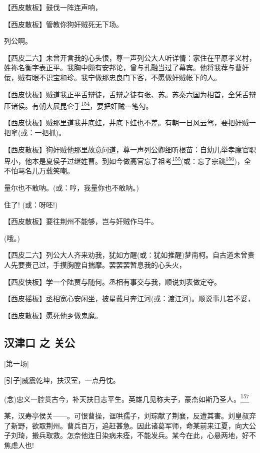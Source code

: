 【西皮散板】鼓伐一阵连声响，

【西皮散板】管教你狗奸贼死无下场。

列公啊。

【西皮二六】未曾开言我的心头恨，尊一声列公大人听详情：家住在平原孝义村，姓祢名衡字表正平。我胸中颇有安邦论，曾与孔融当过了幕宾。他将我荐与曹奸佞，贼有眼不识宝和珍。我宁做那忠良门下客，不愿做奸贼帐下的人。

【西皮快板】贼道我正平舌辩徒，舌辩之徒有张、苏。苏秦六国为相首，全凭舌辩压诸侯。有朝大展昆仑手\protect\hyperlink{fn154}{\textsuperscript{154}}，要把奸贼一笔勾。

【西皮快板】贼那里道我井底蛙，井底下蛙也不差。有朝一日风云驾，要把奸贼一把拿(或：一把抓)。

【西皮散板】狗奸贼他那里故意问道，尊一声列公卿细听根苗：自幼儿举孝廉官职卑小，他本是夏侯子过继姓曹。到如今做高官忘了祖考\protect\hyperlink{fn155}{\textsuperscript{155}}(或：忘了宗祧\protect\hyperlink{fn156}{\textsuperscript{156}})，全不怕骂名儿万载笑嘲。

量尔也不敢呐。(或：哼，我量你也不敢呐。)

住了! (或：呀呸!)

【西皮散板】要往荆州不能够，岂与奸贼作马牛。

(哦。)

【西皮二六】列公大人齐来劝我，犹如方醒(或：犹如推醒)梦南柯。自古道未曾责人先要责己过，手摸胸膛自揣摩。罢罢罢暂息我的心头火，

【西皮快板】学一个陆贾与随何。丞相有事交与我，顺说刘表做定夺。

【西皮摇板】丞相宽心安闲坐，披星戴月奔江河(或：渡江河)。顺说事儿若不妥，

【西皮散板】愿死他乡做鬼魔。

\newpage
\hypertarget{ux6c49ux6d25ux53e3-ux4e4b-ux5173ux516c}{%
\subsection{汉津口 之
关公}\label{ux6c49ux6d25ux53e3-ux4e4b-ux5173ux516c}}

{[}第一场{]}

{[}引子{]}威震乾坤，扶汉室，一点丹忱。

(念)忠义一腔贯古今，补天扶日志平生。英雄几见称夫子，豪杰如斯乃圣人。\protect\hyperlink{fn157}{\textsuperscript{157}}

某，汉寿亭侯关------。可恨曹操，诓哄孺子，刘琮献了荆襄，反遭其害。刘皇叔弃了新野，欲取荆州。曹兵百万，追赶甚急。因此诸葛军师，命某前来江夏，向大公子刘琦，搬兵取救。怎奈他连日染病未痊，不能发兵。某今在此，心悬两地，好不焦虑人也!

